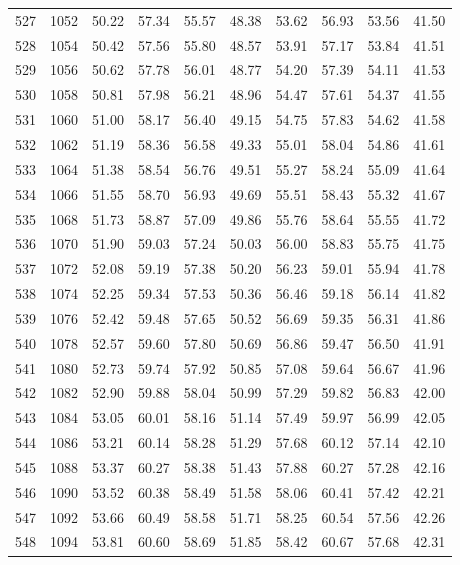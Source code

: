 \begin{longtable}{rrllllllll}
		527 & 1052 & 50.22 & 57.34 & 55.57 & 48.38 & 53.62 & 56.93 & 53.56 & 41.50 \\ 
		528 & 1054 & 50.42 & 57.56 & 55.80 & 48.57 & 53.91 & 57.17 & 53.84 & 41.51 \\ 
		529 & 1056 & 50.62 & 57.78 & 56.01 & 48.77 & 54.20 & 57.39 & 54.11 & 41.53 \\ 
		530 & 1058 & 50.81 & 57.98 & 56.21 & 48.96 & 54.47 & 57.61 & 54.37 & 41.55 \\ 
		531 & 1060 & 51.00 & 58.17 & 56.40 & 49.15 & 54.75 & 57.83 & 54.62 & 41.58 \\ 
		532 & 1062 & 51.19 & 58.36 & 56.58 & 49.33 & 55.01 & 58.04 & 54.86 & 41.61 \\ 
		533 & 1064 & 51.38 & 58.54 & 56.76 & 49.51 & 55.27 & 58.24 & 55.09 & 41.64 \\ 
		534 & 1066 & 51.55 & 58.70 & 56.93 & 49.69 & 55.51 & 58.43 & 55.32 & 41.67 \\ 
		535 & 1068 & 51.73 & 58.87 & 57.09 & 49.86 & 55.76 & 58.64 & 55.55 & 41.72 \\ 
		536 & 1070 & 51.90 & 59.03 & 57.24 & 50.03 & 56.00 & 58.83 & 55.75 & 41.75 \\ 
		537 & 1072 & 52.08 & 59.19 & 57.38 & 50.20 & 56.23 & 59.01 & 55.94 & 41.78 \\ 
		538 & 1074 & 52.25 & 59.34 & 57.53 & 50.36 & 56.46 & 59.18 & 56.14 & 41.82 \\ 
		539 & 1076 & 52.42 & 59.48 & 57.65 & 50.52 & 56.69 & 59.35 & 56.31 & 41.86 \\ 
		540 & 1078 & 52.57 & 59.60 & 57.80 & 50.69 & 56.86 & 59.47 & 56.50 & 41.91 \\ 
		541 & 1080 & 52.73 & 59.74 & 57.92 & 50.85 & 57.08 & 59.64 & 56.67 & 41.96 \\ 
		542 & 1082 & 52.90 & 59.88 & 58.04 & 50.99 & 57.29 & 59.82 & 56.83 & 42.00 \\ 
		543 & 1084 & 53.05 & 60.01 & 58.16 & 51.14 & 57.49 & 59.97 & 56.99 & 42.05 \\ 
		544 & 1086 & 53.21 & 60.14 & 58.28 & 51.29 & 57.68 & 60.12 & 57.14 & 42.10 \\ 
		545 & 1088 & 53.37 & 60.27 & 58.38 & 51.43 & 57.88 & 60.27 & 57.28 & 42.16 \\ 
		546 & 1090 & 53.52 & 60.38 & 58.49 & 51.58 & 58.06 & 60.41 & 57.42 & 42.21 \\ 
		547 & 1092 & 53.66 & 60.49 & 58.58 & 51.71 & 58.25 & 60.54 & 57.56 & 42.26 \\ 
		548 & 1094 & 53.81 & 60.60 & 58.69 & 51.85 & 58.42 & 60.67 & 57.68 & 42.31 \\ 

\end{longtable}
